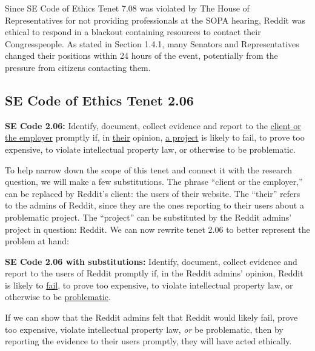 \documentclass[11pt]{article}
\begin{document}
\begin{multicols}{2}
Since SE Code of Ethics Tenet 7.08 was violated by The House of Representatives for not providing professionals at the SOPA hearing, Reddit was ethical to respond in a blackout containing resources to contact their Congresspeople. As stated in Section 1.4.1, many Senators and Representatives changed their positions within 24 hours of the event, potentially from the pressure from citizens contacting them.\cite{sopa-pipa-positions}

\vfill
\columnbreak


   \subsection{SE Code of Ethics Tenet 2.06}

\begin{framed}
\noindent
  \textbf{SE Code 2.06:}
  \newline
  Identify, document, collect evidence and report to the \underline{client or the employer} promptly if, in \underline{their} opinion, \underline{a project} is likely to fail, to prove too expensive, to violate intellectual property law, or otherwise to be problematic.\cite[2.06]{se-code}
\end{framed}

To help narrow down the scope of this tenet and connect it with the research question, we will make a few substitutions. The phrase ``client or the employer,'' can be replaced by Reddit's client: the users of their website. The ``their'' refers to the admins of Reddit, since they are the ones reporting to their users about a problematic project. The ``project'' can be substituted by the Reddit admins' project in question: Reddit. We can now rewrite tenet 2.06 to better represent the problem at hand:

\begin{framed}
\noindent
  \textbf{SE Code 2.06 with substitutions:}
  \newline
  Identify, document, collect evidence and report to the users of Reddit promptly if, in the Reddit admins' opinion, Reddit is likely to \underline{fail}, to prove too expensive, to violate intellectual property law, or otherwise to be \underline{problematic}.\cite[2.06]{se-code}
\end{framed}

If we can show that the Reddit admins felt that Reddit would likely fail, prove too expensive, violate intellectual property law, \emph{or} be problematic, then by reporting the evidence to their users promptly, they will have acted ethically.


\end{multicols}
\end{document}
